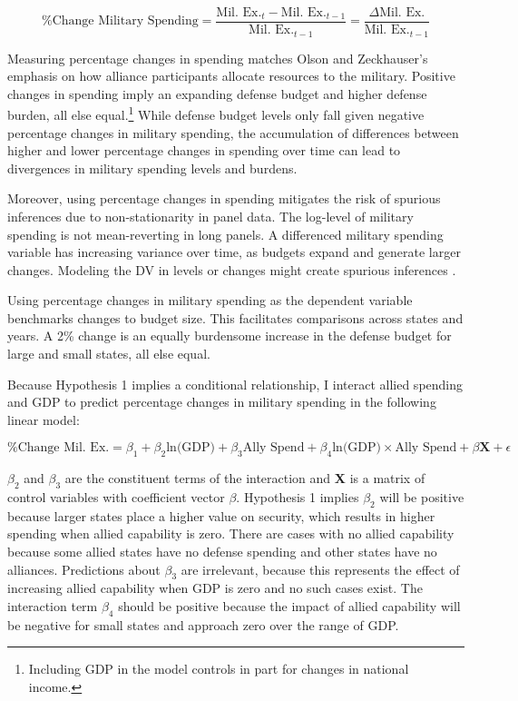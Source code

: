 \documentclass[12pt]{article}
\begin{document}
\begin{equation}
\mbox{\% Change Military Spending} = \frac{\mbox{Mil. Ex.}_t - \mbox{Mil. Ex.}_{t-1} }{ \mbox{Mil. Ex.}_{t-1} } = \frac{\Delta \mbox{Mil. Ex.} }{ \mbox{Mil. Ex.}_{t-1} }
\end{equation} 


Measuring percentage changes in spending matches Olson and Zeckhauser's emphasis on how alliance participants allocate resources to the military.
Positive changes in spending imply an expanding defense budget and higher defense burden, all else equal.\footnote{Including GDP in the model controls in part for changes in national income.} 
While defense budget levels only fall given negative percentage changes in military spending, the accumulation of differences between higher and lower percentage changes in spending over time can lead to divergences in military spending levels and burdens. 


Moreover, using percentage changes in spending mitigates the risk of spurious inferences due to non-stationarity in panel data. 
The log-level of military spending is not mean-reverting in long panels.
A differenced military spending variable has increasing variance over time, as budgets expand and generate larger changes. 
Modeling the DV in levels or changes might create spurious inferences \citep{GrangerNewbold1974}. 


Using percentage changes in military spending as the dependent variable benchmarks changes to budget size. 
This facilitates comparisons across states and years. 
A 2\% change is an equally burdensome increase in the defense budget for large and small states, all else equal. 


Because Hypothesis 1 implies a conditional relationship, I interact allied spending and GDP to predict percentage changes in military spending in the following linear model:

\begin{equation} 
\mbox{\% Change Mil. Ex.} = \beta_1 + \beta_2 \mbox{ln(GDP)} + \beta_3 \mbox{Ally Spend} + \beta_4 \mbox{ln(GDP)} \times \mbox{Ally Spend} + \beta \mathbf{X} + \epsilon
\end{equation}


$\beta_2$ and $\beta_3$ are the constituent terms of the interaction and \textbf{X} is a matrix of control variables with coefficient vector $\beta$.
Hypothesis 1 implies $\beta_2$ will be positive because larger states place a higher value on security, which results in higher spending when allied capability is zero.
There are cases with no allied capability because some allied states have no defense spending and other states have no alliances.  
Predictions about $\beta_3$ are irrelevant, because this represents the effect of increasing allied capability when GDP is zero and no such cases exist. 
The interaction term $\beta_4$ should be positive because the impact of allied capability will be negative for small states and approach zero over the range of GDP. 
\end{document}
